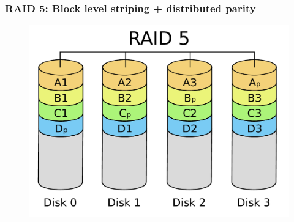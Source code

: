\documentclass{beamer}
\begin{document}
\begin{frame}
    \frametitle{RAID 5: Block level striping + distributed parity}
    \begin{figure}
    \includegraphics[height=0.3\paperwidth]{RAID5.pdf}
    \end{figure}
\end{frame}
\end{document}
